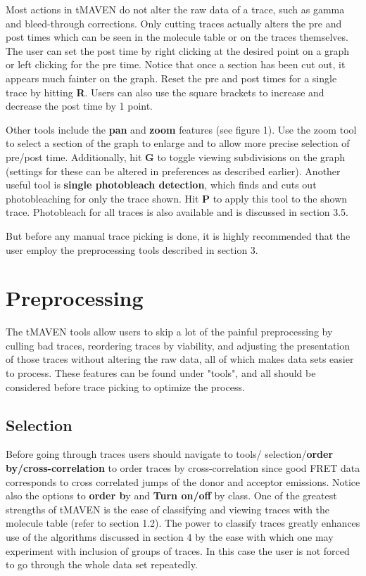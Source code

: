 \documentclass[11pt,a5paper,footinclude=true,headinclude=true]{scrbook} %
\begin{document}
Most actions in tMAVEN do not alter the raw data of a 
trace, such as gamma and bleed-through corrections. Only cutting traces actually alters the pre and post times which can be seen in the molecule table or on the traces themselves. The user can set the post time by right clicking at the desired point on a graph or left clicking for the pre time. Notice that once a section has been cut out, it appears much fainter on the graph. Reset the pre and post times for a single trace by hitting \textbf{R}. Users can also use the square brackets to increase and decrease the post time by 1 point.

Other tools include the \textbf{pan} and \textbf{zoom} features (see figure 1). Use the zoom tool to select a section of the graph to enlarge and to allow more precise selection of pre/post time. Additionally, hit \textbf{G} to toggle viewing subdivisions on the graph (settings for these can be altered in preferences as described earlier). 
Another useful tool is \textbf{single photobleach detection}, which finds and cuts out photobleaching for only the trace shown. Hit \textbf{P} to apply this tool to the shown trace. Photobleach for all traces is also available and is discussed in section 3.5. 

But before any manual trace picking is done, it is highly recommended that the user employ the preprocessing tools described in section 3.
    
\chapter{Preprocessing}
 The tMAVEN tools allow  users to skip a lot of the painful preprocessing by culling bad traces, reordering traces by viability, and adjusting the presentation of those traces without altering the raw data, all of which makes data sets easier to process. These features can be found under "tools", and all should be considered before trace picking to optimize the process. 
\section{Selection}
    Before going through traces users should navigate to tools/ selection/\textbf{order by/cross-correlation} to order traces by cross-correlation since good FRET data corresponds to cross correlated jumps of the donor and acceptor emissions. Notice also the options to \textbf{order b}y and \textbf{Turn on/off} by class.
    One of the greatest strengths of tMAVEN is the ease of classifying and viewing traces with the molecule table (refer to section 1.2). The power to classify traces greatly enhances use of the algorithms discussed in section 4 by the ease with which one  may experiment with inclusion of groups of traces. In this case the user is not forced to go through the whole data set repeatedly. 
\end{document}
